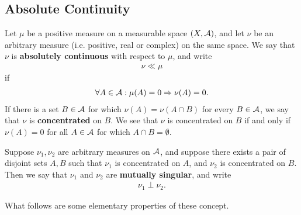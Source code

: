 \documentclass[../../main.tex]{subfiles}
\begin{document}
\subsection{Absolute Continuity}

Let $\mu$ be a positive measure on a measurable space $(X, \mathcal{A})$, and let $\nu$ be an arbitrary measure (i.e. positive, real or complex) on the same space. We say that $\nu$ is \textbf{absolutely continuous} with respect to $\mu$, and write
\begin{align*}
	\nu \ll \mu
\end{align*}
if
\begin{align*}
	\forall A\in \mathcal{A}: \mu(A) = 0 \Rightarrow \nu(A) = 0.
\end{align*}
If there is a set $B\in \mathcal{A}$ for which $\nu(A)=\nu(A\cap B)$ for every $B\in \mathcal{A}$, we say that $\nu$ is \textbf{concentrated} on $B$. We see that $\nu$ is concentrated on $B$ if and only if $\nu(A)=0$ for all $A\in \mathcal{A}$ for which $A\cap B=\emptyset$.

Suppose $\nu_{1}, \nu_{2}$ are arbitrary measures on $\mathcal{A}$, and suppose there exists a pair of disjoint sets $A, B$ such that $\nu_{1}$ is concentrated on $A$, and $\nu_{2}$ is concentrated on $B$. Then we say that $\nu_{1}$ and $\nu_{2}$ are \textbf{mutually singular}, and write
\begin{align*}
	\nu_{1} \perp \nu_{2}.
\end{align*}

What follows are some elementary properties of these concept.
\end{document}
